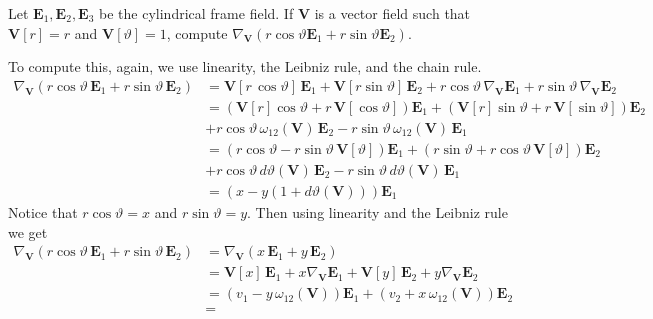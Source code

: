 \documentclass[12 pt, letterpaper]{hmcpset}
\begin{document}
\pagebreak

\begin{problem}[Problem 4.]
	Let $\mathbf{E}_{1}, \mathbf{E}_{2}, \mathbf{E}_{3}$ be the cylindrical frame field. If $\mathbf{V}$ is a vector field such that $\mathbf{V}[r] = r$ and $\mathbf{V}[\vartheta] = 1$, compute $\nabla_{\mathbf{V}}(r \cos{\vartheta} \mathbf{E}_{1} + r \sin{\vartheta} \mathbf{E}_{2})$.
\end{problem}

\begin{solution}
	To compute this, again, we use linearity, the Leibniz rule, and the chain rule.
	\[
		\begin{split}
			\nabla_{\mathbf{V}}(r \cos{\vartheta} \, \mathbf{E}_{1} + r \sin{\vartheta} \, \mathbf{E}_{2}) & = \mathbf{V}[r \, \cos{\vartheta}] \, \mathbf{E}_{1} + \mathbf{V}[r \sin{\vartheta}] \, \mathbf{E}_{2} + r \cos{\vartheta} \, \nabla_{\mathbf{V}} \mathbf{E}_{1} + r \sin{\vartheta} \, \nabla_{\mathbf{V}} \mathbf{E}_{2} \\
														       & = (\mathbf{V}[r] \cos{\vartheta} + r \, \mathbf{V}[\cos{\vartheta}]) \mathbf{E}_{1} + (\mathbf{V}[r] \sin{\vartheta} + r \, \mathbf{V}[\sin{\vartheta}]) \mathbf{E}_{2} \\
														       & + r \cos{\vartheta} \, \omega_{12}(\mathbf{V}) \, \mathbf{E}_{2} - r \sin{\vartheta} \, \omega_{12}(\mathbf{V}) \, \mathbf{E}_{1} \\
														       & = (r \cos{\vartheta} - r \sin{\vartheta} \, \mathbf{V}[\vartheta]) \mathbf{E}_{1} + (r \sin{\vartheta} + r \cos{\vartheta} \, \mathbf{V}[\vartheta]) \mathbf{E}_{2} \\
														       & + r \cos{\vartheta} \, d\vartheta (\mathbf{V}) \, \mathbf{E}_{2} - r \sin{\vartheta} \, d\vartheta(\mathbf{V}) \, \mathbf{E}_{1} \\
														       & = (x - y (1 + d\vartheta(\mathbf{V}))) \mathbf{E}_{1}
		\end{split}
	\]
	Notice that $r \cos{\vartheta} = x$ and $r \sin{\vartheta} = y$. Then using linearity and the Leibniz rule we get
	\[
		\begin{split}
			\nabla_{\mathbf{V}}(r \cos{\vartheta} \, \mathbf{E}_{1} + r \sin{\vartheta} \, \mathbf{E}_{2}) & = \nabla_{\mathbf{V}}(x \, \mathbf{E}_{1} + y \, \mathbf{E}_{2}) \\
														       & = \mathbf{V}[x] \, \mathbf{E}_{1} + x \nabla_{\mathbf{V}} \mathbf{E}_{1} + \mathbf{V}[y] \, \mathbf{E}_{2} + y \nabla_{\mathbf{V}} \mathbf{E}_{2} \\
														       & = (v_{1} - y \, \omega_{12}(\mathbf{V})) \mathbf{E}_{1} + (v_{2} + x \, \omega_{12}(\mathbf{V})) \mathbf{E}_{2} \\
														       & = 
		\end{split}
	\]
\end{solution}
\end{document}
